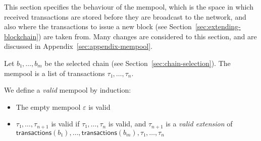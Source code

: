 \documentclass{article}
\newcommand{\emptylist}{ε}
\newcommand{\transactions}[1]{\mathsf{transactions}(#1)}
\begin{document}
This section specifies the behaviour of the mempool, which is the
space in which received transactions are stored before they are
broadcast to the network, and also where the transactions to issue a
new block (see Section~\ref{sec:extending-blockchain}) are taken
from. Many changes are considered to this section, and are discussed
in Appendix~\ref{sec:appendix-mempool}.

Let $b₁,…,b_m$ be the selected chain (see
Section~\ref{sec:chain-selection}). The mempool is a list of
transactions $τ₁,…,τ_n$.

We define a \emph{valid} mempool by induction:
\begin{itemize}
\item The empty mempool $\emptylist$ is valid
\item $τ₁,…,τ_{n+1}$ is valid if $τ₁,…,τ_n$ is valid, and $τ_{n+1}$ is
  a \emph{valid extension} of $\transactions{b₁},…,\transactions{b_m}, τ₁,…,τ_n$
\end{itemize}
\end{document}
